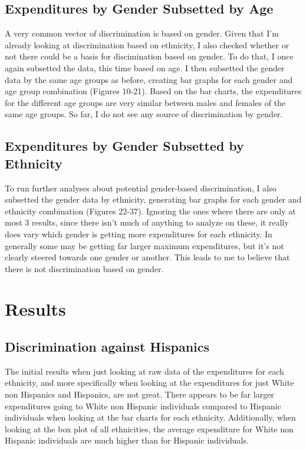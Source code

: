 \documentclass[12pt,letterpaper]{article}
\begin{document}
	\subsection{Expenditures by Gender Subsetted by Age}
	A very common vector of discrimination is based on gender. Given that I'm already looking at discrimination based on ethnicity, I also checked whether or not there could be a basis for discimination based on gender. To do that, I once again subsetted the data, this time based on age. I then subsetted the gender data by the same age groups as before, creating bar graphs for each gender and age group combination (Figures 10-21). Based on the bar charts, the expenditures for the different age groups are very similar between males and females of the same age groups. So far, I do not see any source of discrimination by gender.
	
	\subsection{Expenditures by Gender Subsetted by Ethnicity}
	To run further analyses about potential gender-based discrimination, I also subsetted the gender data by ethnicity, generating bar graphs for each gender and ethnicity combination (Figures 22-37). Ignoring the ones where there are only at most 3 results, since there isn't much of anything to analyze on these, it really does vary which gender is getting more expenditures for each ethnicity. In generally some may be getting far larger maximum expenditures, but it's not clearly steered towards one gender or another. This leads to me to believe that there is not discrimination based on gender.
	
	\section{Results}
	\subsection{Discrimination against Hispanics}
	The initial results when just looking at raw data of the expenditures for each ethnicity, and more specifically when looking at the expenditures for just White non Hispanics and Hispanics, are not great. There appears to be far larger expenditures going to White non Hispanic individuals compared to Hispanic individuals when looking at the bar charts for each ethnicity. Additionally, when looking at the box plot of all ethnicities, the average expenditure for White non Hispanic individuals are much higher than for Hispanic individuals.
	
\end{document}
